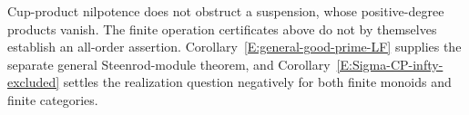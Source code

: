 \begin{remark}\label{E:sigma-open}
Cup-product nilpotence does not obstruct a suspension, whose
positive-degree products vanish.  The finite operation certificates
above do not by themselves establish an all-order assertion.
Corollary~\ref{E:general-good-prime-LF} supplies the separate general
Steenrod-module theorem, and
Corollary~\ref{E:Sigma-CP-infty-excluded} settles the realization
question negatively for both finite monoids and finite categories.
\end{remark}
